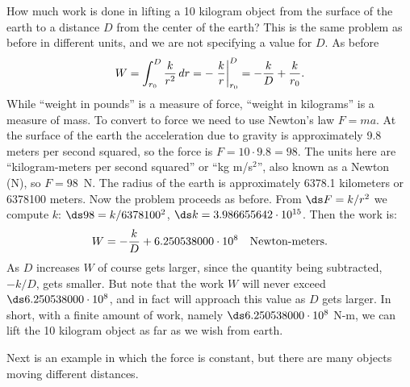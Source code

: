 \begin{example} How much work is done in lifting a 10 kilogram object from the
surface of the earth to a distance $D$ from the center of the earth?
This is the same problem as before in different units, and we are not
specifying a value for $D$. As before
$$W=\int_{r_0}^{D} {k\over r^2}\,dr= -\left.{k\over
  r}\right|_{r_0}^{D}=-{k\over D}+{k\over r_0}.$$ 
While ``weight in pounds'' is a measure of force, ``weight in
kilograms'' is a measure of mass. To convert to force we need to use
Newton's law $F=ma$. At the surface of the earth the acceleration due
to gravity is approximately 9.8 meters per second squared, so the
force is $F=10\cdot 9.8=98$. The units here are ``kilogram-meters per
second squared'' or ``kg m/s$^2$'', also known as a
Newton (N), so $F=98$~N.  The radius of the earth is
approximately 6378.1 kilometers or 6378100 meters.
Now the problem proceeds as before. From
$\ds F=k/r^2$ we compute $k$:
$\ds 98=k/6378100^2$, $\ds k= 3.986655642\cdot 10^{15}$. Then the work is:
$$W=-{k\over D}+6.250538000\cdot 10^8\quad\hbox{Newton-meters.}$$
As $D$ increases $W$ of course gets larger, since the quantity being
subtracted, $-k/D$, gets smaller. But note that the work $W$ will
never exceed $\ds 6.250538000\cdot 10^8$, and in fact will approach this
value as $D$ gets larger. In short, with a finite amount of work, namely
$\ds 6.250538000\cdot 10^8$ N-m, we can lift the 10 kilogram object as far
as we wish from earth.
\end{example}
\label{example:object to infinity}

Next is an example in which the force is constant, but there are many
objects moving different distances.

